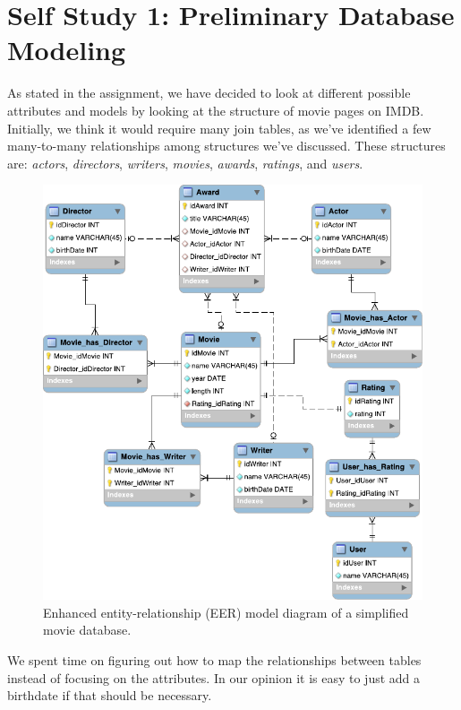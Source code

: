 \section{Self Study 1: Preliminary Database Modeling}

As stated in the assignment, we have decided to look at different possible attributes and models by looking at the structure of movie pages on IMDB\@. Initially, we think it would require many join tables, as we've identified a few many-to-many relationships among structures we've discussed. These structures are: \emph{actors}, \emph{directors}, \emph{writers}, \emph{movies}, \emph{awards}, \emph{ratings}, and \emph{users}.

\begin{figure}[H]
  \centering
  \includegraphics[width=\linewidth]{1-06.02.14/selfStudy1db.pdf}
  \caption{Enhanced entity-relationship (EER) model diagram of a simplified movie database.}\label{fig:model}
\end{figure}

We spent time on figuring out how to map the relationships between tables
instead of focusing on the attributes. In our opinion it is easy to just add a
birthdate if that should be necessary.

